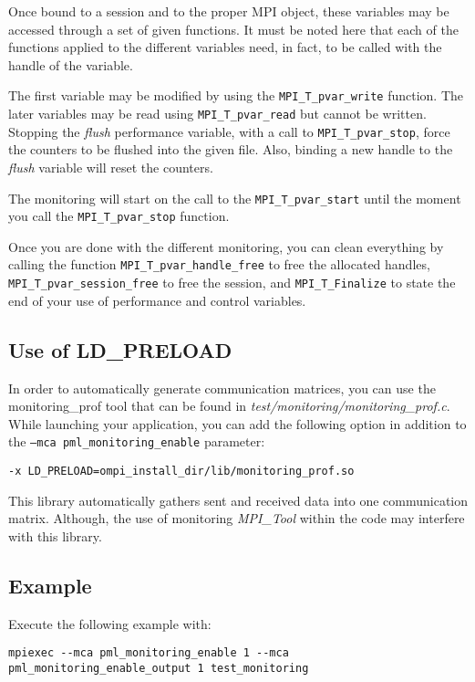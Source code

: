 \documentclass[notitlepage]{article}
\newcommand{\mpit}[1]{\textit{MPI\_Tool#1}}
\begin{document}
Once bound to a session and to the proper MPI object, these variables
may be accessed through a set of given functions. It must be noted
here that each of the functions applied to the different variables
need, in fact, to be called with the handle of the variable.

The first variable may be modified by using the
\texttt{MPI\_T\_pvar\_write} function. The later variables may be read
using \texttt{MPI\_T\_pvar\_read} but cannot be written. Stopping the
\textit{flush} performance variable, with a call to
\texttt{MPI\_T\_pvar\_stop}, force the counters to be flushed into the
given file. Also, binding a new handle to the \textit{flush} variable
will reset the counters.

The monitoring will start on the call to the
\texttt{MPI\_T\_pvar\_start} until the moment you call the
\texttt{MPI\_T\_pvar\_stop} function.

Once you are done with the different monitoring, you can clean
everything by calling the function \texttt{MPI\_T\_pvar\_handle\_free}
to free the allocated handles, \texttt{MPI\_T\_pvar\_session\_free} to
free the session, and \texttt{MPI\_T\_Finalize} to state the end of
your use of performance and control variables.

\subsection{Use of \textsc{LD_PRELOAD}}

In order to automatically generate communication matrices, you can use
the monitoring_prof tool that can be found in
\textit{test/monitoring/monitoring_prof.c}. While launching your
application, you can add the following option in addition to the
\texttt{--mca pml\_monitoring\_enable} parameter:
\begin{description}
\item [\texttt{-x LD_PRELOAD=ompi_install_dir/lib/monitoring_prof.so}]
\end{description}

This library automatically gathers sent and received data into one
communication matrix. Although, the use of monitoring \mpit{} within
the code may interfere with this library.

\subsection{Example}

Execute the following example with:
\begin{verbatim}
mpiexec --mca pml_monitoring_enable 1 --mca pml_monitoring_enable_output 1 test_monitoring
\end{verbatim}
\end{document}
